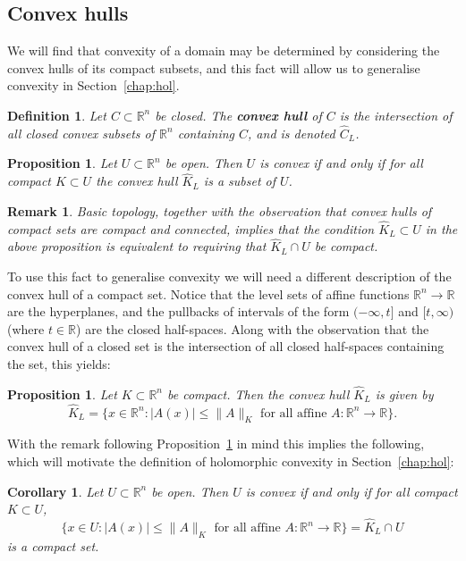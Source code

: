 \documentclass[11pt,a4paper, final, twoside]{article}
\newtheorem{corollary}[theorem]{Corollary}
\newtheorem{definition}[theorem]{Definition}
\newtheorem{proposition}[theorem]{Proposition}
\newtheorem{remark}[theorem]{Remark}
\numberwithin{equation}{section}
\newcommand{\R}{\mathbb R}
\begin{document}
\subsection{Convex hulls}
We will find that convexity of a domain may be determined by considering the convex hulls of its compact subsets, and this fact will allow us to generalise convexity in Section~\ref{chap:hol}. 
\begin{definition}
Let $C\subset\R^n$ be closed. The \textbf{convex hull} of $C$ is the intersection of all closed convex subsets of $\R^n$ containing $C$, and is denoted $\hat C_L$.
\end{definition}
\begin{proposition}
\label{conholcon}
Let $U\subset\R^n$ be open. Then $U$ is convex if and only if for all compact $K\subset U$ the convex hull $\hat K_L$ is a subset of $U$.
\end{proposition}
\begin{remark}
Basic topology, together with the observation that convex hulls of compact sets are compact and connected, implies that the condition $\hat K_L\subset U$ in the above proposition
is equivalent to requiring that $\hat K_L\cap U$ be compact.
\end{remark}
To use this fact to generalise convexity we will need a different description of the convex hull of a compact set. 
Notice that the level sets of affine functions $\R^n\to\R$ are the hyperplanes, and the pullbacks of intervals of the form $(-\infty,t]$ and $[t,\infty)$ (where $t\in\R$) are the closed half-spaces.
Along with the observation that the convex hull of a closed set is the intersection of all closed half-spaces containing the set, this yields:
\begin{proposition}
Let $K\subset\R^n$ be compact. Then the convex hull $\hat K_L$ is given by
\begin{equation*}\label{convexhulleqdef} \hat K_L=\{x\in\R^n\colon |A(x)|\leq \|A\|_K \mbox{ for all affine $A\colon\R^n\to\R$}\}. \end{equation*}
\end{proposition}
With the remark following Proposition~\ref{conholcon} in mind this implies the following, which will motivate the definition of holomorphic convexity in Section~\ref{chap:hol}:
\begin{corollary}
\label{congen}
Let $U\subset\R^n$ be open. Then $U$ is convex if and only if for all compact $K\subset U$,
$$ \{x\in U\colon |A(x)|\leq \|A\|_K\mbox{ for all affine $A\colon\R^n\to\R$}\} =\hat K_L\cap U $$
is a compact set.
\end{corollary}
\end{document}
